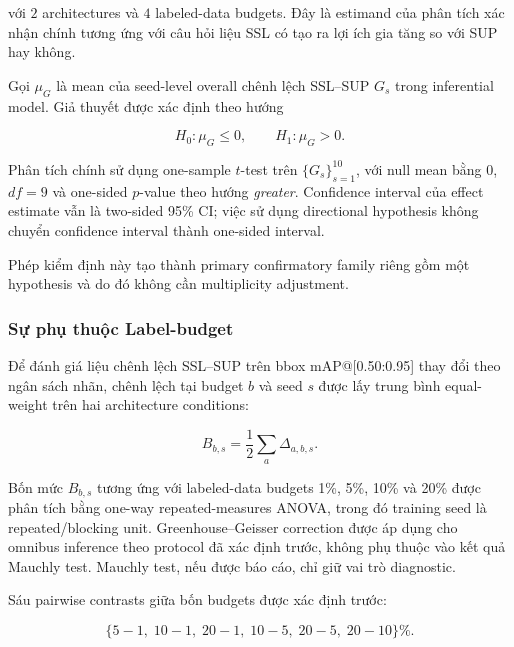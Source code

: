 \documentclass[pdflatex,sn-mathphys-num]{sn-jnl}%
\theoremstyle{thmstyleone}%
\theoremstyle{thmstyletwo}%
\theoremstyle{thmstylethree}%
\begin{document}
với \(2\) architectures và \(4\) labeled-data budgets. Đây là estimand của
phân tích xác nhận chính tương ứng với câu hỏi liệu SSL có tạo ra lợi ích
gia tăng so với SUP hay không.

Gọi \(\mu_G\) là mean của seed-level overall chênh lệch SSL--SUP \(G_s\)
trong inferential model. Giả thuyết được xác định theo hướng

\begin{equation}
H_{0}:\mu_G\leq0,
\qquad
H_{1}:\mu_G>0.
\label{eq:primary_ssl_hypothesis}
\end{equation}

Phân tích chính sử dụng one-sample \(t\)-test trên
\(\{G_s\}_{s=1}^{10}\), với null mean bằng \(0\), \(df=9\) và
one-sided \(p\)-value theo hướng \textit{greater}. Confidence interval của
effect estimate vẫn là two-sided 95\% CI; việc sử dụng directional
hypothesis không chuyển confidence interval thành one-sided interval.

Phép kiểm định này tạo thành primary confirmatory family riêng gồm một
hypothesis và do đó không cần multiplicity adjustment.

\subsubsection{Sự phụ thuộc Label-budget}
\label{subsubsec:secondary_formal_analyses}

Để đánh giá liệu chênh lệch SSL--SUP trên bbox mAP@[0.50:0.95] thay đổi theo ngân sách nhãn, chênh lệch tại budget \(b\) và seed \(s\) được lấy trung bình equal-weight trên
hai architecture conditions:

\begin{equation}
B_{b,s}
=
\frac{1}{2}
\sum_{a}
\Delta_{a,b,s}.
\label{eq:budget_seed_effect}
\end{equation}

Bốn mức \(B_{b,s}\) tương ứng với labeled-data budgets
1\%, 5\%, 10\% và 20\% được phân tích bằng one-way repeated-measures ANOVA,
trong đó training seed là repeated/blocking unit. Greenhouse--Geisser
correction được áp dụng cho omnibus inference theo protocol đã xác định
trước, không phụ thuộc vào kết quả Mauchly test. Mauchly test, nếu được báo
cáo, chỉ giữ vai trò diagnostic.

Sáu pairwise contrasts giữa bốn budgets được xác định trước:

\begin{equation}
\{5-1,\;10-1,\;20-1,\;10-5,\;20-5,\;20-10\}\%.
\label{eq:rq3_pairwise_contrasts}
\end{equation}
\end{document}
